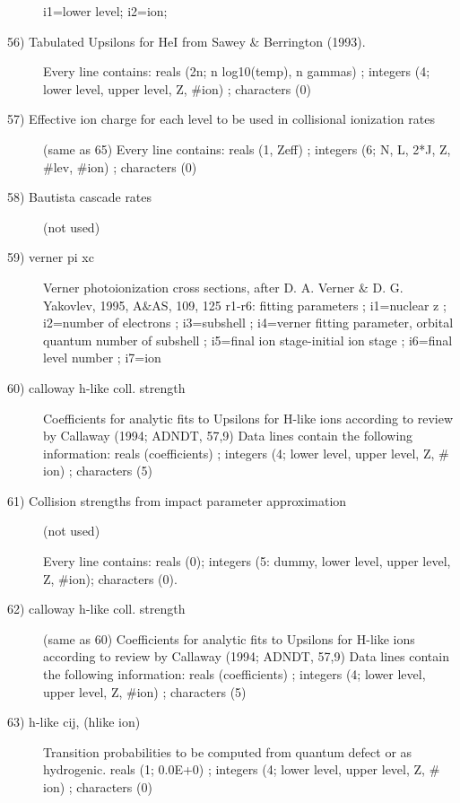 \begin{description}
i1=lower level; i2=ion;



\item[56) Tabulated Upsilons for HeI from Sawey $\&$ Berrington (1993).]
 Every line contains:
 reals (2n; n log10(temp), n gammas)          
; integers (4; lower level, upper level, Z, $\#$ion)
; characters (0)

\item[57) Effective ion charge for each level to be used in collisional ionization rates]
(same as 65)
 Every line contains:
 reals (1, Zeff)
; integers (6; N, L, 2*J, Z, $\#$lev, $\#$ion)
; characters (0)

\item[58) Bautista cascade rates]
(not used)

\item[59) verner pi xc                                     ]

 Verner photoionization cross sections, after 
 D. A. Verner $\&$ D. G. Yakovlev, 1995, A$\&$AS, 109, 125
 r1-r6:  fitting parameters
; i1=nuclear z
; i2=number of electrons
; i3=subshell
; i4=verner fitting parameter, orbital quantum number of subshell
; i5=final ion stage-initial ion stage
; i6=final level number
; i7=ion

\item[60) calloway h-like coll. strength                   ]

 Coefficients for analytic fits to Upsilons
 for H-like ions according to review by Callaway (1994;
 ADNDT,
 57,9)
 Data lines contain the following information:
 reals (coefficients)
; integers (4; lower level, upper level, Z, $\#$ion)
; characters (5)

\item[61) Collision strengths from impact parameter approximation] 
(not used)

Every line contains: reals (0); integers (5: dummy, lower level, 
upper level, Z, $\#$ion); characters (0).

\item[62) calloway h-like coll. strength                   ]
(same as 60)
 Coefficients for analytic fits to Upsilons
 for H-like ions according to review by Callaway (1994;
 ADNDT,
 57,9)
 Data lines contain the following information:
 reals (coefficients)
; integers (4; lower level, upper level, Z, $\#$ion)
; characters (5)

\item[63) h-like cij,  (hlike ion)                 ]
 Transition probabilities to be computed from quantum defect or as 
 hydrogenic.
 reals (1; 0.0E+0)
; integers (4; lower level, upper level, Z, $\#$ion)
; characters (0)


\end{description}
